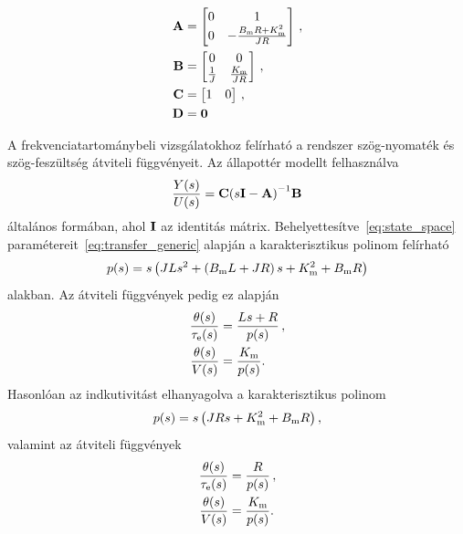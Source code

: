 \begin{equation}\label{eq:state_space_reduced}
    \begin{split}
        \mathbf{A} &= 
        \begin{bmatrix}
            0 & 1 \\
            0 & -\frac{B_{\mathrm{m}} R + K^2_{\mathrm{m}}}{JR} \\
        \end{bmatrix}\,,\\
        \mathbf{B} &=
        \begin{bmatrix}
            0 & 0 \\
            \frac{1}{J} & \frac{K_{\mathrm{m}}}{JR} \\
        \end{bmatrix}\,,\\
        \mathbf{C} &=
        \begin{bmatrix}
            1 & 0 \\
        \end{bmatrix}\,,\\
        \mathbf{D} &= \mathbf{0}
    \end{split}
\end{equation}

A frekvenciatartománybeli vizsgálatokhoz felírható a rendszer 
szög-nyomaték és szög-feszültség átviteli függvényeit. Az állapottér modellt felhasználva
\begin{align}\label{eq:transfer_generic}
    \frac{Y(s)}{U(s)} = \mathbf{C}{\left(s \mathbf{I} - \mathbf{A}\right)}^{-1} \mathbf{B}
\end{align}
általános formában, ahol $\mathbf{I}$ az identitás mátrix. Behelyettesítve~\eqref{eq:state_space} 
paramétereit~\eqref{eq:transfer_generic} alapján a karakterisztikus polinom felírható
\begin{align}\label{eq:characteristic_polynomial}
    p(s) = s\left(JLs^2 + \left(B_{\mathrm{m}} L + JR\right)s + K_{\mathrm{m}}^2 + B_{\mathrm{m}} R\right)
\end{align}
alakban. Az átviteli függvények pedig ez alapján
\begin{equation}\label{eq:transfer_function}
    \begin{split}
        \frac{\theta(s)}{\tau_{\mathrm{e}}(s)} &= \frac{Ls + R}{p(s)}\,,\\
        \frac{\theta(s)}{V(s)} &= \frac{K_{\mathrm{m}}}{p(s)}.
    \end{split}
\end{equation}
Hasonlóan az indkutivitást elhanyagolva a karakterisztikus polinom
\begin{align}\label{eq:characteristic_polynomial}
    p(s) = s\left(JRs + K_{\mathrm{m}}^2 + B_{\mathrm{m}} R\right),
\end{align}
valamint az átviteli függvények
\begin{equation}\label{eq:transfer_function}
    \begin{split}
        \frac{\theta(s)}{\tau_{\mathrm{e}}(s)} &= \frac{R}{p(s)}\,,\\
        \frac{\theta(s)}{V(s)} &= \frac{K_{\mathrm{m}}}{p(s)}.
    \end{split}
\end{equation}

